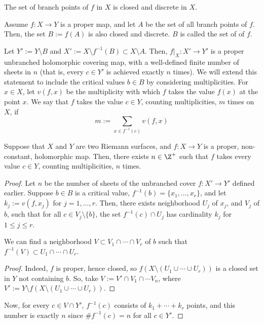 \documentclass[11pt]{report}
\begin{document}
\begin{rmk}
    The set of branch points of $f$ in $X$ is closed and discrete in $X$.
\end{rmk}

\begin{defn}
Assume $f:X \to Y$ is a proper map, and let $A$ be the set of all branch points of $f$. Then, the set $B:= f(A)$ is also closed and discrete. $B$ is called the set of  of $f$. 
\end{defn}

Let $Y' :=Y \setminus B$ and $X' := X \setminus f^{-1}(B) \subset X \setminus A$. Then, $f|_X : X' \to Y'$ is a proper unbranched holomorphic covering map, with a well-defined finite number of sheets in $n$ (that is, every $c \in Y'$ is achieved exactly $n$ times). We will extend this statement to include the critical values $b \in B$ by considering multiplicities. For $x \in X$, let $v(f,x)$ be the multiplicity with which $f$ takes the value $f(x)$ at the point $x$. We say that $f$ takes the value $c \in Y$, counting multiplicities, $m$ times on $X$, if
$$m := \sum_{x \in f^{-1}(c)}v(f,x)$$

\begin{thm}[][label=thm:sheet_counting]
    Suppose that $X$ and $Y$ are two Riemann surfaces, and $f:X \to Y$ is a proper, non-constant, holomorphic map. Then, there exists $n \in \Z^+$ such that $f$ takes every value $c \in Y$, counting multiplicities, $n$ times.
\end{thm}

\begin{proof}
    Let $n$ be the number of sheets of the unbranched cover $f:X' \to Y'$ defined earlier. Suppose $b \in B$ is a critical value, $f^{-1}(b) = \{x_1,\dots,x_r\}$, and let $k_j:= v(f,x_j)$ for $j=1,\dots,r$. Then, there exists neighborhood $U_j$ of $x_j$, and $V_j$ of $b$, such that for all $c \in V_j\setminus \{b\}$, the set $f^{-1}(c) \cap U_j$ has cardinality $k_j$ for $1 \leq j \leq r$. 
    \begin{claim}
        We can find a neighborhood $V \subset V_1 \cap \cdots \cap V_r$ of $b$ such that $f^{-1}(V) \subset U_1 \cap \cdots \cap U_r$.
    \end{claim}
    \begin{proof}
        Indeed, $f$ is proper, hence closed, so $f(X \setminus (U_1 \cup \cdots \cup U_r))$ is a closed set in $Y$ not containing $b$. So, take $V:=V'\cap V_1 \cap \cdots V_n$, where $V' :=Y\setminus f(X\setminus(U_1 \cup \cdots \cup U_r)).$
    \end{proof}
    Now, for every $c \in V \cap Y'$, $f^{-1}(c)$ consists of $k_1 + \cdots + k_r$ points, and this number is exactly $n$ since $\#f^{-1}(c)=n$ for all $c \in Y'$.
\end{proof}
\end{document}
